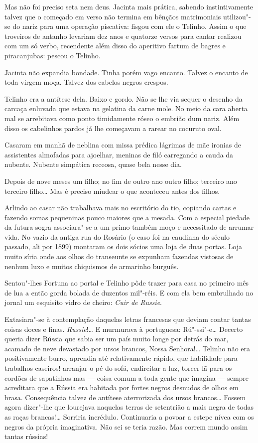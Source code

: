 \begin{linenumbers}
Mas não foi preciso seta nem deus. Jacinta mais prática, sabendo
instintivamente talvez que o começado em verso não termina em bênçãos
matrimoniais utilizou"-se do nariz para uma operação piscativa: fisgou
com ele o Telinho. Assim o que troveiros de antanho levariam dez anos e
quatorze versos para cantar realizou com um só verbo, recendente além
disso do aperitivo fartum de bagres e piracanjubas: pescou o Telinho.

Jacinta não expandia bondade. Tinha porém vago encanto. Talvez o encanto
de toda virgem moça. Talvez dos cabelos negros crespos.

Telinho era a antítese dela. Baixo e gordo. Não se lhe via sequer o
desenho da carcaça enluvada que estava na gelatina da carne mole. No
meio da cara aberta mal se arrebitava como ponto timidamente róseo o
embrião dum nariz. Além disso os cabelinhos pardos já lhe começavam a
rarear no cocuruto oval.

Casaram em manhã de neblina com missa prédica lágrimas de mãe ironias de
assistentes almofadas para ajoelhar, meninas de filó carregando a cauda
da nubente. Nubente simpática receosa, quase bela nesse dia.

Depois de nove meses um filho; no fim de outro ano outro filho; terceiro
ano terceiro filho\ldots{} Mas é preciso miudear o que aconteceu antes dos
filhos.

Arlindo ao casar não trabalhava mais no escritório do tio, copiando
cartas e fazendo somas pequeninas pouco maiores que a mesada. Com a
especial piedade da futura sogra associara"-se a um primo também moço e
necessitado de arrumar vida. No vazio da antiga rua do Rosário (o caso
foi na caudinha do século passado, ali por 1899) montaram os dois sócios
uma loja de duas portas. Loja muito síria onde aos olhos do transeunte
se expunham fazendas vistosas de nenhum luxo e muitos chiquismos de
armarinho burguês.

Sentou"-lhes Fortuna ao portal e Telinho pôde trazer para casa no
primeiro mês de lua a então gorda bolada de duzentos mil"-réis. E com ela
bem embrulhado no jornal um esquisito vidro de cheiro: \emph{Cuir de
Russie}.

Extasiara"-se à contemplação daquelas letras francesas que deviam contar
tantas coisas doces e finas. \emph{Russie}!\ldots{} E murmurava à portuguesa:
Rú"-ssi"-e\ldots{} Decerto queria dizer Rússia que sabia ser um país muito
longe por detrás do mar, acamado de neve devastado por ursos brancos,
Nossa Senhora!\ldots{} Telinho não era positivamente burro, aprendia até
relativamente rápido, que habilidade para trabalhos caseiros! arranjar o
pé do sofá, endireitar a luz, torcer lã para os cordões de sapatinhos
mas --- coisa comum a toda gente que imagina --- sempre acreditara que a
Rússia era habitada por fortes negros desnudos de olhos em brasa.
Consequência talvez de antítese aterrorizada dos ursos brancos\ldots{} Fossem
agora dizer"-lhe que lourejava naquelas terras de setentrião a mais negra
de todas as raças brancas!\ldots{} Sorriria incrédulo. Continuaria a povoar a
estepe nívea com os negros da própria imaginativa. Não sei se teria
razão. Mas correm mundo assim tantas rússias!


\end{linenumbers}
